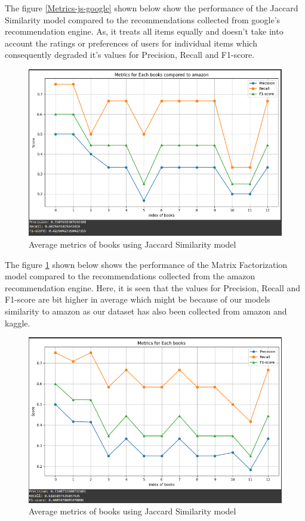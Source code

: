     The figure \ref{Metrics-js-google} shown below show the performance of the Jaccard Similarity model compared to the recommendations collected from google's recommendation engine. As, it treats all items equally and doesn't take into account the ratings or preferences of users for individual items which consequently degraded it's values for Precision, Recall and F1-score.
    
    \newpage

    \begin{figure}[h]
        \centering
        \includegraphics[width=1\linewidth]{img/Graphics/JS_Amazon.PNG}
        \caption{Average metrics of books using Jaccard Similarity model}
        \label{Metrics-js-amazon}
    \end{figure}

\newpage
    The figure \ref{Metrics-js-amazon} shown below shows the performance of the Matrix Factorization model compared to the recommendations collected from the amazon recommendation engine. Here, it is seen that the values for Precision, Recall and F1-score are bit higher in average which might be because of our models similarity to amazon as our dataset has also been collected from amazon and kaggle.
    
    \newpage

    \begin{figure}[h]
        \centering
        \includegraphics[width=1\linewidth]{img/Graphics/JS.PNG}
        \caption{Average metrics of books using Jaccard Similarity model}
        \label{Metrics-js}
    \end{figure}

